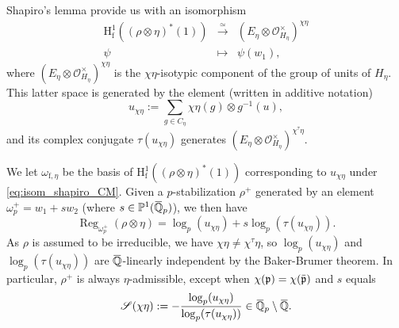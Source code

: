 \documentclass[12pt]{amsart}
\newcommand\bQ{\mathbb{Q}}
\newcommand\bP{\mathbb{P}}
\newcommand\cO{\mathcal{O}}
\newcommand\gp{\mathfrak{p}}
\newcommand\sS{\mathscr{S}}
\newcommand{\ob}[1]{\mkern 1.5mu\overline{\mkern-1.5mu#1\mkern-1.5mu}\mkern 1.5mu}
\DeclareMathOperator{\Reg}{Reg}
\newcommand{\HH}{\mathrm{H}}
\newcommand{\ff}{\mathrm{f}}
\theoremstyle{defstyle}
\theoremstyle{thmstyle}
\begin{document}
 Shapiro's lemma provide us with an isomorphism
\begin{equation}\label{eq:isom_shapiro_CM}
	\begin{array}{rcl}
	\HH^1_\ff((\rho\otimes\eta)^*(1)) & \overset{\simeq}{\longrightarrow} & (E_\eta\otimes \cO_{H_\eta}^\times)^{\chi\eta} \\
	\psi & \mapsto & \psi(w_1),
\end{array}
\end{equation}
 where  $({E_\eta}\otimes \cO_{H_\eta}^\times)^{\chi\eta}$ is the $\chi\eta$-isotypic component of the group of units of $H_\eta$. This latter space is generated by the element (written in additive notation)
\begin{equation}\label{eq:u_chi}
	u_{\chi\eta}:= \sum_{g\in C_\eta} \chi\eta(g) \otimes g^{-1}(u),
\end{equation}
and its complex conjugate $\tau(u_{\chi\eta})$ generates $(E_\eta\otimes \cO_{H_\eta}^\times)^{\chi^\tau\eta}$.

We let $\omega_{\ff,\eta}$ be the basis of $\HH^1_\ff((\rho\otimes\eta)^*(1))$ corresponding to $u_{\chi\eta}$ under \eqref{eq:isom_shapiro_CM}. Given a $p$-stabilization $\rho^+$ generated by an element $\omega_p^+=w_1+sw_2$ (where $s\in \bP^1(\ob{\bQ}_p)$), we then have 
$$\Reg_{{\omega}^+_{p}}(\rho\otimes\eta)=\log_p(u_{\chi\eta})+s\log_p(\tau(u_{\chi\eta})).$$ 
As $\rho$ is assumed to be irreducible, we have $\chi\eta\neq\chi^\tau\eta$, so $\log_p(u_{\chi\eta})$ and $\log_p(\tau(u_{\chi\eta}))$ are $\ob{\bQ}$-linearly independent by the Baker-Brumer theorem. In particular, $\rho^+$ is always $\eta$-admissible, except when $\chi(\gp)=\chi(\ob{\gp})$ and $s$ equals 
\[\sS(\chi\eta):=-\frac{\log_p(u_{\chi\eta})}{\log_p(\tau(u_{\chi\eta}))} \in \ob{\bQ}_p\setminus\ob{\bQ}. \]
\end{document}
